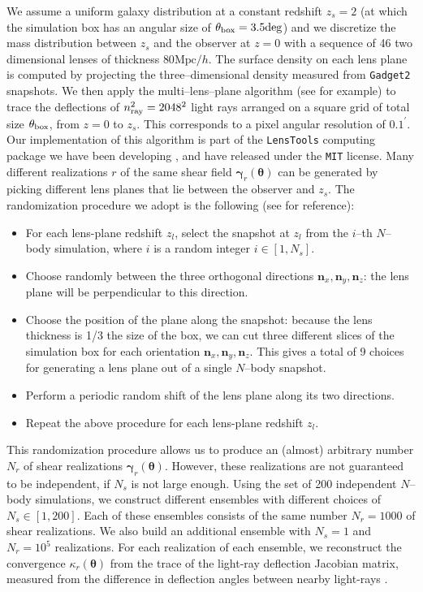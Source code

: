 \documentclass[reprint,aps,prd,superscriptaddress,showkeys,showpacs]{revtex4-1}
\newcommand{\bb}[1]{\mathbf{#1}}
\begin{document}
We assume a uniform galaxy distribution at a constant redshift $z_s=2$
(at which the simulation box has an angular size of $\theta_{\rm
  box}=3.5\mathrm{deg}$) and we discretize the mass distribution
between $z_s$ and the observer at $z=0$ with a sequence of 46 two
dimensional lenses of thickness $80\mathrm{Mpc}/h$. The surface
density on each lens plane is computed by projecting the
three--dimensional density measured from \texttt{Gadget2}
snapshots. We then apply the multi--lens--plane algorithm (see
\citep{RayTracingHartlap,RayTracingJain} for example) to trace the
deflections of $n_{\rm ray}^2=2048^2$ light rays arranged on a square grid
of total size $\theta_{\rm box}$, from $z=0$ to $z_s$. This corresponds to a pixel angular resolution of $0.1^\prime$. 
Our implementation of this algorithm is part of the \texttt{LensTools}
computing package we have been developing \citep{LensTools}, and have
released under the \texttt{MIT} license. Many different realizations
$r$ of the same shear field $\pmb{\gamma}_r(\pmb{\theta})$ can be
generated by picking different lens planes that lie between the
observer and $z_s$. The randomization procedure we adopt is the
following (see \citep{Sato12} for reference):

\begin{itemize}
\item For each lens-plane redshift $z_l$, select the snapshot at $z_l$ from the $i$--th $N$--body simulation, where $i$ is a random integer $i\in [1,N_s]$.
\item Choose randomly between the three orthogonal directions ${\bb{n}_x,\bb{n}_y,\bb{n}_z}$: the lens plane will be perpendicular to this direction.
\item Choose the position of the plane along the snapshot: because the lens thickness is 1/3 the size of the box, we can cut three different slices of the simulation box for each orientation ${\bb{n}_x,\bb{n}_y,\bb{n}_z}$. This gives a total of 9 choices for generating a lens plane out of a single $N$--body snapshot.
\item Perform a periodic random shift of the lens plane along its two directions.
\item Repeat the above procedure for each lens-plane redshift $z_l$.
\end{itemize}  
%
This randomization procedure allows us to produce an (almost)
arbitrary number $N_r$ of shear realizations
$\pmb{\gamma}_r(\pmb{\theta})$. However, these realizations are not
guaranteed to be independent, if $N_s$ is not large enough. Using the
set of 200 independent $N$--body simulations, we construct different
ensembles with different choices of $N_s\in[1,200]$. Each of these
ensembles consists of the same number $N_r=1000$ of shear
realizations. We also build an additional ensemble with $N_s=1$ and
$N_r=10^5$ realizations. For each realization of each ensemble, we
reconstruct the convergence $\kappa_r(\pmb{\theta})$ from the trace of
the light-ray deflection Jacobian matrix, measured from the difference
in deflection angles between nearby light-rays
\citep{RayTracingHartlap,RayTracingJain,Sato12}.
\end{document}
